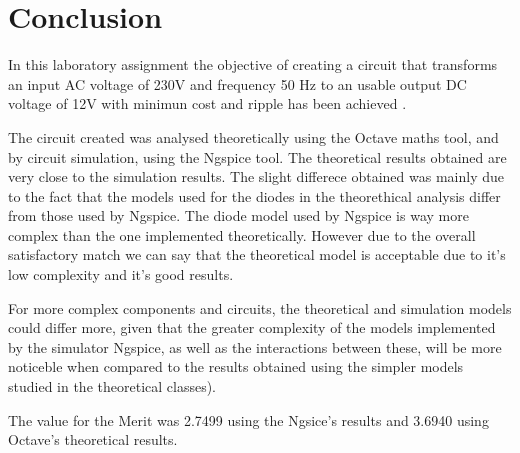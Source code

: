 \section{Conclusion}
\label{sec:conclusion}

In this laboratory assignment the objective of creating a circuit that transforms an input AC voltage of 230V and frequency 50 Hz to an usable output DC voltage of 12V with minimun cost and ripple has been achieved .\par
The circuit created was analysed theoretically using  the Octave maths tool, and by circuit simulation, using the
Ngspice tool. The theoretical results obtained are very close to the simulation results. The slight differece obtained was mainly due to the fact that the models used for the diodes in the theorethical analysis differ from those used by Ngspice. The diode model used by Ngspice is way more complex than the one implemented theoretically. However due to the overall satisfactory match we can say that the theoretical model is acceptable due to it's low complexity and it's good results. \par
 For more complex components and circuits, the
theoretical and simulation models could differ more, given that the greater complexity of the models implemented by the simulator Ngspice, as well as the interactions between these, will be more noticeble when compared to the results obtained using the simpler models studied in the theoretical classes).\par
The value for the Merit was 2.7499 using the Ngsice's results and  3.6940 using Octave's theoretical results.  

